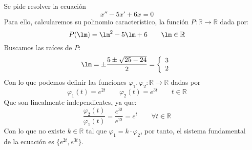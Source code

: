 \begin{ejemplo}
    Se pide resolver la ecuación
    \begin{equation*}
        x'' - 5x' + 6x = 0
    \end{equation*}
    Para ello, calcularemos su polinomio característico, la función $P:\mathbb{R}\rightarrow\mathbb{R}$ dada por:
    \begin{equation*}
        P(\lm) = \lm^2 - 5\lm + 6 \qquad \lm \in \mathbb{R}
    \end{equation*}
    Buscamos las raíces de $P$:
    \begin{equation*}
        \lm = \pm \dfrac{5\pm \sqrt{25 - 24}}{2} = \left\{\begin{array}{l}
            3 \\
            2
        \end{array}\right.
    \end{equation*}
    Con lo que podemos definir las funciones $\varphi_1,\varphi_2:\mathbb{R}\rightarrow\mathbb{R}$ dadas por
    \begin{equation*}
        \varphi_1(t) = e^{2t} \qquad \varphi_2(t) = e^{3t} \qquad t\in \mathbb{R}
    \end{equation*}
    Que son linealmente independientes, ya que:
    \begin{equation*}
        \dfrac{\varphi_2(t)}{\varphi_1(t)} = \dfrac{e^{3t}}{e^{2t}} = e^t \qquad \forall t\in \mathbb{R}
    \end{equation*}
    Con lo que no existe $k\in \mathbb{R}$ tal que $\varphi_1 = k \cdot \varphi_2$, por tanto, el sistema fundamental de la ecuación es $\{e^{2t}, e^{3t}\}$.
\end{ejemplo}

